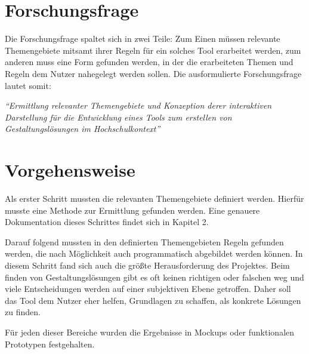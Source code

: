 
\section{Forschungsfrage}
Die Forschungsfrage spaltet sich in zwei Teile: Zum Einen müssen relevante Themengebiete mitsamt ihrer Regeln für ein solches Tool erarbeitet werden, zum anderen muss eine Form gefunden werden, in der die erarbeiteten Themen und Regeln dem Nutzer nahegelegt werden sollen.
Die ausformulierte Forschungsfrage lautet somit:

\textit{“Ermittlung relevanter Themengebiete und Konzeption derer interaktiven Darstellung für die Entwicklung eines Tools zum erstellen von Gestaltungslösungen im Hochschulkontext”}




\section{Vorgehensweise}
Als erster Schritt mussten die relevanten Themengebiete definiert werden. Hierfür musste eine Methode zur Ermittlung gefunden werden. Eine genauere Dokumentation dieses Schrittes findet sich in Kapitel 2.

Darauf folgend mussten in den definierten Themengebieten Regeln gefunden werden, die nach Möglichkeit auch programmatisch abgebildet werden können.
In diesem Schritt fand sich auch die größte Herausforderung des Projektes. Beim finden von Gestaltungslösungen gibt es oft keinen richtigen oder falschen weg und viele Entscheidungen werden auf einer subjektiven Ebene getroffen. Daher soll das Tool dem Nutzer eher helfen, Grundlagen zu schaffen, als konkrete Lösungen zu finden.

Für jeden dieser Bereiche wurden die Ergebnisse in Mockups oder funktionalen Prototypen festgehalten.



\clearpage
